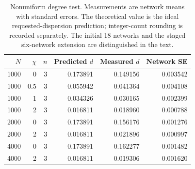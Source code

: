 \begin{table}[t]
\centering
\caption{Nonuniform degree test. Measurements are network means with
standard errors. The theoretical value is the ideal requested-dispersion
prediction; integer-count rounding is recorded separately. The initial 18
networks and the staged six-network extension are distinguished in the text.}
\label{tab:degree}
\begin{tabular}{rrrrrr}
\toprule
$N$&$\chi$&$n$&Predicted $d$&Measured $d$&Network SE\\
\midrule
1000&0&3&0.173891&0.149156&0.003542\\
1000&0.5&3&0.055942&0.041364&0.004108\\
1000&1&3&0.034326&0.030165&0.002399\\
1000&2&3&0.016811&0.018960&0.000788\\
2000&0&3&0.173891&0.156176&0.001276\\
2000&2&3&0.016811&0.021896&0.000997\\
4000&0&3&0.173891&0.162277&0.001482\\
4000&2&3&0.016811&0.019306&0.001620\\
\bottomrule
\end{tabular}
\end{table}
